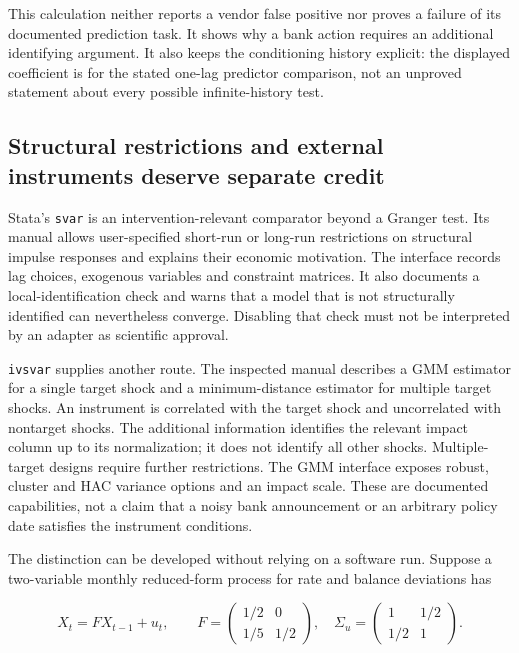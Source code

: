 This calculation neither reports a vendor false positive nor proves a
failure of its documented prediction task. It shows why a bank action
requires an additional identifying argument. It also keeps the
conditioning history explicit: the displayed coefficient is for the
stated one-lag predictor comparison, not an unproved statement about
every possible infinite-history test.

\hypertarget{structural-restrictions-and-external-instruments-deserve-separate-credit}{%
\subsection{Structural restrictions and external instruments deserve
separate
credit}\label{structural-restrictions-and-external-instruments-deserve-separate-credit}}

Stata's \texttt{svar} is an intervention-relevant comparator beyond a
Granger test. Its manual allows user-specified short-run or long-run
restrictions on structural impulse responses and explains their economic
motivation. The interface records lag choices, exogenous variables and
constraint matrices. It also documents a local-identification check and
warns that a model that is not structurally identified can nevertheless
converge. Disabling that check must not be interpreted by an adapter as
scientific approval. \citep{exec13_ct_stata_svar}

\texttt{ivsvar} supplies another route. The inspected manual describes a
GMM estimator for a single target shock and a minimum-distance estimator
for multiple target shocks. An instrument is correlated with the target
shock and uncorrelated with nontarget shocks. The additional information
identifies the relevant impact column up to its normalization; it does
not identify all other shocks. Multiple-target designs require further
restrictions. The GMM interface exposes robust, cluster and HAC variance
options and an impact scale. These are documented capabilities, not a
claim that a noisy bank announcement or an arbitrary policy date
satisfies the instrument conditions.\citep{exec13_ct_stata_ivsvar}

The distinction can be developed without relying on a software run.
Suppose a two-variable monthly reduced-form process for rate and balance
deviations has

\[
 X_t=FX_{t-1}+u_t,\qquad
 F=\begin{pmatrix}1/2&0\\1/5&1/2\end{pmatrix},\quad
 \Sigma_u=\begin{pmatrix}1&1/2\\1/2&1\end{pmatrix}.
\]

